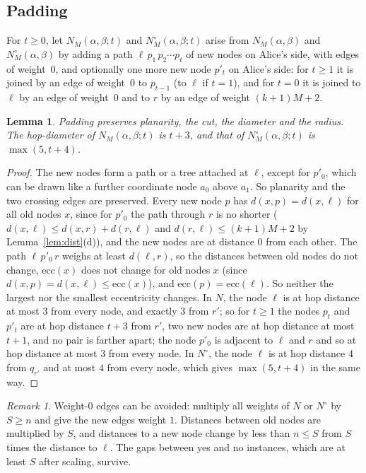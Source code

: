\documentclass[11pt]{article}
\newtheorem{lemma}[theorem]{Lemma}
\theoremstyle{definition}
\theoremstyle{remark}
\newtheorem{remark}[theorem]{Remark}
\newcommand{\ecc}{\mathrm{ecc}}
\begin{document}
\subsection{Padding}

For $t\ge 0$, let $N_M(\alpha,\beta;t)$ and $N^\circ_M(\alpha,\beta;t)$ arise from $N_M(\alpha,\beta)$ and $N^\circ_M(\alpha,\beta)$ by adding a path $\ell\,p_1\,p_2\cdots p_t$ of new nodes on Alice's side, with edges of weight~$0$, and optionally one more new node $p'_t$ on Alice's side: for $t\ge1$ it is joined by an edge of weight~$0$ to $p_{t-1}$ (to $\ell$ if $t=1$), and for $t=0$ it is joined to $\ell$ by an edge of weight~$0$ and to $r$ by an edge of weight $(k+1)M+2$.

\begin{lemma}\label{lem:pad}
Padding preserves planarity, the cut, the diameter and the radius. The hop-diameter of $N_M(\alpha,\beta;t)$ is $t+3$, and that of $N^\circ_M(\alpha,\beta;t)$ is $\max(5,t+4)$.
\end{lemma}

\begin{proof}
The new nodes form a path or a tree attached at $\ell$, except for $p'_0$, which can be drawn like a further coordinate node $a_0$ above $a_1$. So planarity and the two crossing edges are preserved. Every new node $p$ has $d(x,p)=d(x,\ell)$ for all old nodes $x$, since for $p'_0$ the path through $r$ is no shorter ($d(x,\ell)\le d(x,r)+d(r,\ell)$ and $d(r,\ell)\le(k+1)M+2$ by Lemma~\ref{lem:dist}(d)), and the new nodes are at distance $0$ from each other. The path $\ell\,p'_0\,r$ weighs at least $d(\ell,r)$, so the distances between old nodes do not change, $\ecc(x)$ does not change for old nodes $x$ (since $d(x,p)=d(x,\ell)\le\ecc(x)$), and $\ecc(p)=\ecc(\ell)$. So neither the largest nor the smallest eccentricity changes. In $N$, the node $\ell$ is at hop distance at most $3$ from every node, and exactly $3$ from $r'$; so for $t\ge1$ the nodes $p_t$ and $p'_t$ are at hop distance $t+3$ from $r'$, two new nodes are at hop distance at most $t+1$, and no pair is farther apart; the node $p'_0$ is adjacent to $\ell$ and $r$ and so at hop distance at most $3$ from every node. In $N^\circ$, the node $\ell$ is at hop distance $4$ from $q_{r'}$ and at most $4$ from every node, which gives $\max(5,t+4)$ in the same way.
\end{proof}

\begin{remark}
Weight-$0$ edges can be avoided: multiply all weights of $N$ or $N^\circ$ by $S\ge n$ and give the new edges weight $1$. Distances between old nodes are multiplied by $S$, and distances to a new node change by less than $n\le S$ from $S$ times the distance to $\ell$. The gaps between yes and no instances, which are at least $S$ after scaling, survive.
\end{remark}
\end{document}
